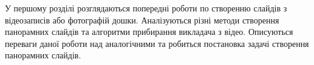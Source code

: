 У першому розділі розглядаються попередні роботи
по створенню слайдів з відеозаписів або фотографій дошки.
Аналізуються різні методи створення панорамних слайдів
та алгоритми прибирання викладача з відео. Описуються переваги 
даної роботи над аналогічними та
робиться постановка задачі створення панорамних слайдів.